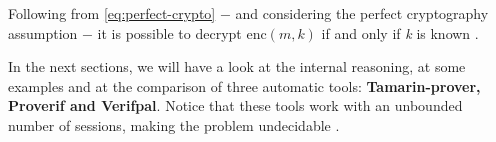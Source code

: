 Following from \cref{eq:perfect-crypto} $-$ and considering the perfect cryptography assumption $-$ it is possible to decrypt $\mbox{enc}\left(m, k\right)$ if and only if \textit{k} is known \cite{SymbolicComputationalBlanchet}.

In the next sections, we will have a look at the internal reasoning, at some examples and at the comparison of three automatic tools: \textbf{Tamarin-prover, Proverif and Verifpal}. Notice that these tools work with an unbounded number of sessions, making the problem undecidable \cite{SymbolicComputationalBlanchet}.
